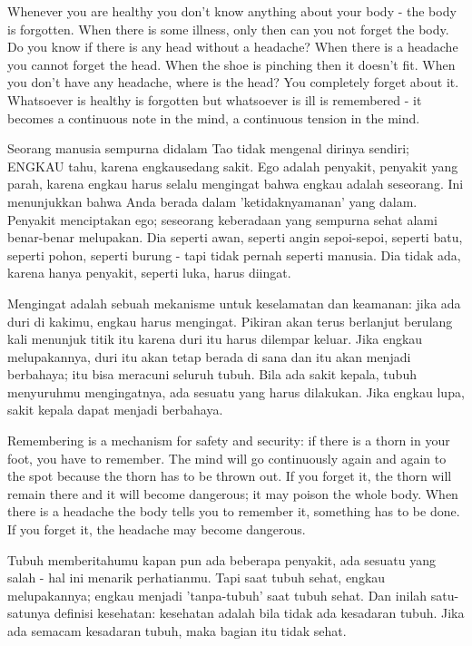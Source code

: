 \english
Whenever you are healthy you don't know anything about your body - the body is forgotten. When there is some illness, only then can you not forget the body. Do you know if there is any head without a headache? When there is a headache you cannot forget the head. When the shoe is pinching then it doesn't fit. When you don't have any headache, where is the head? You completely forget about it. Whatsoever is healthy is forgotten but whatsoever is ill is remembered - it becomes a continuous note in the mind, a continuous tension in the mind.

\bahasa
Seorang manusia sempurna didalam Tao tidak mengenal dirinya sendiri; ENGKAU tahu, karena engkausedang sakit. Ego adalah penyakit, penyakit yang parah, karena engkau harus selalu mengingat bahwa engkau adalah seseorang. Ini menunjukkan bahwa Anda berada dalam 'ketidaknyamanan' yang dalam. Penyakit menciptakan ego; seseorang keberadaan yang sempurna sehat alami benar-benar melupakan. Dia seperti awan, seperti angin sepoi-sepoi, seperti batu, seperti pohon, seperti burung - tapi tidak pernah seperti manusia. Dia tidak ada, karena hanya penyakit, seperti luka, harus diingat.

\bahasa
Mengingat adalah sebuah mekanisme untuk keselamatan dan keamanan: jika ada duri di kakimu, engkau harus mengingat. Pikiran akan terus berlanjut berulang kali menunjuk titik itu karena duri itu harus dilempar keluar. Jika engkau melupakannya, duri itu akan tetap berada di sana dan itu akan menjadi berbahaya; itu bisa meracuni seluruh tubuh. Bila ada sakit kepala, tubuh menyuruhmu mengingatnya, ada sesuatu yang harus dilakukan. Jika engkau lupa, sakit kepala dapat menjadi berbahaya.

\english
Remembering is a mechanism for safety and security: if there is a thorn in your foot, you have to remember. The mind will go continuously again and again to the spot because the thorn has to be thrown out. If you forget it, the thorn will remain there and it will become dangerous; it may poison the whole body. When there is a headache the body tells you to remember it, something has to be done. If you forget it, the headache may become dangerous.

\bahasa
Tubuh memberitahumu kapan pun ada beberapa penyakit, ada sesuatu yang salah - hal ini menarik perhatianmu. Tapi saat tubuh sehat, engkau melupakannya; engkau menjadi 'tanpa-tubuh' saat tubuh sehat. Dan inilah satu-satunya definisi kesehatan: kesehatan adalah bila tidak ada kesadaran tubuh. Jika ada semacam kesadaran tubuh, maka bagian itu tidak sehat.

